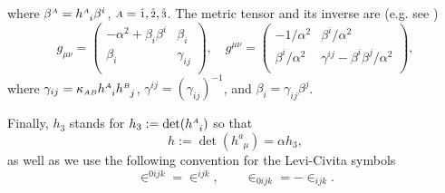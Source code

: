 \documentclass[
10pt, %
a4paper, %
oneside, %
headinclude,footinclude, %
BCOR5mm, %
]{scrartcl}
\newcommand{\IP}[1]{{\color{Red}[IP:\ \ #1]}}
\newcommand{\sA}{\mathsmaller A}
\newcommand{\sB}{\mathsmaller B}
\newcommand{\tetrsymbol}{h}
\newcommand{\tetr}[2]{\tetrsymbol^{#1}_{\phantom{#1}#2}}
\newcommand{\detTetr}{\tetrsymbol}
\newcommand{\ET}[2]{E^{#1}_{\phantom{#1}#2}}	%
\newcommand{\Dm}[2]{D_{\phantom{#2}#1}^{#2}}	%
\newcommand{\aD}[2]{\mathcal{D}_{\phantom{#2}#1}^{#2}}	%
\newcommand{\BT}[2]{B^{#1#2}}	%
\newcommand{\Bm}[2]{B^{#1#2}}	%
\newcommand{\aB}[2]{\mathcal{B}^{#1#2}}	%
\newcommand{\hT}[2]{H_{#1#2}}	%
\newcommand{\LagBE}{\mathcal{L}}%
\newcommand{\Um}{U}%
\newcommand{\LCsymb}{\bm{\in}}    %
\newcommand{\indalg}[1]{\hat{\mathsmaller{#1}}}
\begin{document}
where $ \beta^{\sA} = \tetr{\sA}{i}\beta^i$, $ \sA = \indalg{1},\indalg{2},\indalg{3}$.
The metric tensor and its inverse are (e.g. see \cite{Gourgoulhon2012a})
\begin{equation}
	g_{\mu\nu} = \left(
	\begin{array}{cc}
		-\alpha^2 + \beta_i\beta^i & \beta_i \\[1mm]
		\beta_i & \gamma_{ij}  \\
	\end{array}
	\right) ,
	\quad
	g^{\mu\nu} = \left(
	\begin{array}{cc}
		-1/\alpha^2       & \beta^i/\alpha^2 \\[1mm]
		\beta^{i}/\alpha^2 & \gamma^{ij} - \beta^i\beta^j/\alpha^2  \\
	\end{array}
	\right) ,
\end{equation}
where $ \gamma_{ij} = \kappa_{\sA\sB} \tetr{\sA}{i}\tetr{\sB}{j}$, $ 
\gamma^{ij} = \left( \gamma_{ij} \right)^{-1}  $, and $ \beta_i =  \gamma_{ij}\beta^j$.

Finally, $ \detTetr_3 $ stands for $ \detTetr_3 := \det(\tetr{\sA}{i}) $ so that
\begin{equation}\label{eqn.det}
	\detTetr := \det(\tetr{a}{\mu}) = \alpha \detTetr_3,
\end{equation}
as well as we use the following convention for the Levi-Civita symbols
\begin{equation}\label{eqn.LC.3d}
	\LCsymb^{0ijk} = \LCsymb^{ijk}, 
	\qquad
	\LCsymb_{0ijk} =-\LCsymb_{ijk}.
\end{equation}




%
\end{document}
